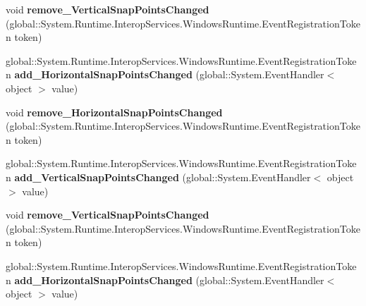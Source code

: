 \begin{DoxyCompactItemize}
void {\bfseries remove\+\_\+\+Vertical\+Snap\+Points\+Changed} (global\+::\+System.\+Runtime.\+Interop\+Services.\+Windows\+Runtime.\+Event\+Registration\+Token token)
\item 
\mbox{\label{interface_windows_1_1_u_i_1_1_xaml_1_1_controls_1_1_primitives_1_1_i_scroll_snap_points_info_a821f2a593f07df670bedc1aa736522df}} 
global\+::\+System.\+Runtime.\+Interop\+Services.\+Windows\+Runtime.\+Event\+Registration\+Token {\bfseries add\+\_\+\+Horizontal\+Snap\+Points\+Changed} (global\+::\+System.\+Event\+Handler$<$ object $>$ value)
\item 
\mbox{\label{interface_windows_1_1_u_i_1_1_xaml_1_1_controls_1_1_primitives_1_1_i_scroll_snap_points_info_aa3fb03dbd56b4a79ce2cb3184e76cd1a}} 
void {\bfseries remove\+\_\+\+Horizontal\+Snap\+Points\+Changed} (global\+::\+System.\+Runtime.\+Interop\+Services.\+Windows\+Runtime.\+Event\+Registration\+Token token)
\item 
\mbox{\label{interface_windows_1_1_u_i_1_1_xaml_1_1_controls_1_1_primitives_1_1_i_scroll_snap_points_info_a571d9a77feb356614085f5bd5c61164d}} 
global\+::\+System.\+Runtime.\+Interop\+Services.\+Windows\+Runtime.\+Event\+Registration\+Token {\bfseries add\+\_\+\+Vertical\+Snap\+Points\+Changed} (global\+::\+System.\+Event\+Handler$<$ object $>$ value)
\item 
\mbox{\label{interface_windows_1_1_u_i_1_1_xaml_1_1_controls_1_1_primitives_1_1_i_scroll_snap_points_info_aa8b329ace55d867384797aed3c99571d}} 
void {\bfseries remove\+\_\+\+Vertical\+Snap\+Points\+Changed} (global\+::\+System.\+Runtime.\+Interop\+Services.\+Windows\+Runtime.\+Event\+Registration\+Token token)
\item 
\mbox{\label{interface_windows_1_1_u_i_1_1_xaml_1_1_controls_1_1_primitives_1_1_i_scroll_snap_points_info_a821f2a593f07df670bedc1aa736522df}} 
global\+::\+System.\+Runtime.\+Interop\+Services.\+Windows\+Runtime.\+Event\+Registration\+Token {\bfseries add\+\_\+\+Horizontal\+Snap\+Points\+Changed} (global\+::\+System.\+Event\+Handler$<$ object $>$ value)

\end{DoxyCompactItemize}
